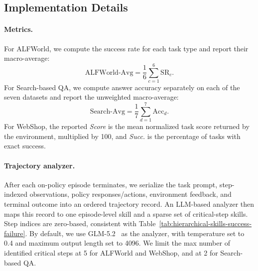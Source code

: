 \documentclass{llmxive}
\begin{document}
\subsection{Implementation Details}\label{app:implementation_details}
\paragraph{Metrics.}
For ALFWorld, we compute the success rate for each task type and report their macro-average:
\begin{equation}
    \mathrm{ALFWorld\text{-}Avg}
    = \frac{1}{6}\sum_{c=1}^{6}\mathrm{SR}_{c}.
\end{equation}
For Search-based QA, we compute answer accuracy separately on each of the seven datasets and report the unweighted macro-average:
\begin{equation}
    \mathrm{Search\text{-}Avg}
    = \frac{1}{7}\sum_{d=1}^{7}\mathrm{Acc}_{d}.
\end{equation}
For WebShop, the reported \textit{Score} is the mean normalized task score returned by the environment, multiplied by 100, and \textit{Succ.} is the percentage of tasks with exact success. 

\paragraph{Trajectory analyzer.}
After each on-policy episode terminates, we serialize the task prompt, step-indexed observations, policy responses/actions, environment feedback, and terminal outcome into an ordered trajectory record. An LLM-based analyzer then maps this record to one episode-level skill and a sparse set of critical-step skills. Step indices are zero-based, consistent with Table~\ref{tab:hierarchical-skills-success-failure}. By default, we use GLM-5.2~\citep{zai2026glm52} as the analyzer, with temperature set to 0.4 and maximum output length set to 4096. We limit the max number of identified critical steps at 5 for ALFWorld and WebShop, and at 2 for Search-based QA.
\end{document}
